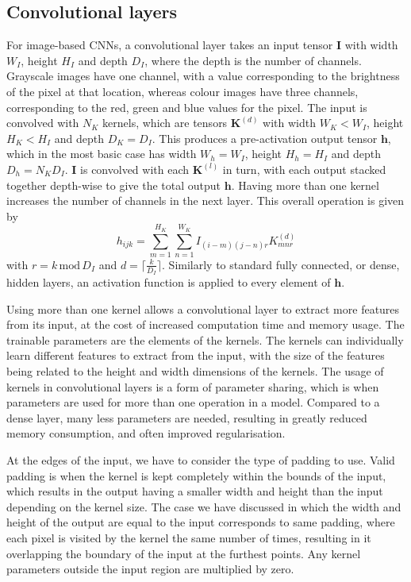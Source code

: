\documentclass[12pt]{article}
\begin{document}
\subsection{Convolutional layers}
For image-based CNNs, a convolutional layer takes an input tensor $\bm{I}$ with width $W_I$, height $H_I$ and depth $D_I$, where the depth is the number of channels. Grayscale images have one channel, with a value corresponding to the brightness of the pixel at that location, whereas colour images have three channels, corresponding to the red, green and blue values for the pixel. The input is convolved with $N_K$ kernels, which are tensors $\bm{K}^{(d)}$ with width $W_K<W_I$, height $H_K<H_I$ and depth $D_K=D_I$. This produces a pre-activation output tensor $\bm{\bm{h}}$, which in the most basic case has width $W_h=W_I$, height $H_h=H_I$ and depth $D_h=N_KD_I$. $\bm{I}$ is convolved with each $\bm{K}^{(l)}$ in turn, with each output stacked together depth-wise to give the total output $\bm{h}$. Having more than one kernel increases the number of channels in the next layer. This overall operation is given by
\begin{equation}
h_{ijk}=\sum_{m=1}^{H_K}\sum_{n=1}^{W_K}I_{(i-m)(j-n)r}K_{mnr}^{(d)}
\end{equation}
with $r=k\,\mathrm{mod}\,D_I$ and $d=\lceil\frac{k}{D_I}\rceil$. Similarly to standard fully connected, or dense, hidden layers, an activation function is applied to every element of $\bm{h}$. 

Using more than one kernel allows a convolutional layer to extract more features from its input, at the cost of increased computation time and memory usage. The trainable parameters are the elements of the kernels. The kernels can individually learn different features to extract from the input, with the size of the features being related to the height and width dimensions of the kernels. The usage of kernels in convolutional layers is a form of parameter sharing, which is when parameters are used for more than one operation in a model. Compared to a dense layer, many less parameters are needed, resulting in greatly reduced memory consumption, and often improved regularisation. 

At the edges of the input, we have to consider the type of padding to use. Valid padding is when the kernel is kept completely within the bounds of the input, which results in the output having a smaller width and height than the input depending on the kernel size. The case we have discussed in which the width and height of the output are equal to the input corresponds to same padding, where each pixel is visited by the kernel the same number of times, resulting in it overlapping the boundary of the input at the furthest points. Any kernel parameters outside the input region are multiplied by zero.
\end{document}
